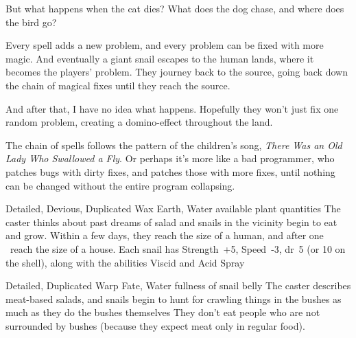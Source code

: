 But what happens when the cat dies?
What does the dog chase, and where does the bird go?

Every spell adds a new problem, and every problem can be fixed with more magic.
And eventually a giant snail escapes to the human lands, where it becomes the players' problem.
They journey back to the source, going back down the chain of magical fixes until they reach the source.

And after that, I have no idea what happens.
Hopefully they won't just fix one random problem, creating a domino-effect throughout the land.

The chain of spells follows the pattern of the children's song, \textit{There Was an Old Lady Who Swallowed a Fly}.
Or perhaps it's more like a bad programmer, who patches bugs with dirty fixes, and patches those with more fixes, until nothing can be changed without the entire program collapsing.


  {Detailed, Devious, Duplicated}%
  {Wax}%
  {Earth, Water}%
  {available plant quantities}%
  {The caster thinks about past dreams of salad and  snails in the vicinity begin to eat and grow.
  Within a few days, they reach the size of a human, and after one \showOnset\ reach the size of a house.
  Each snail has Strength~+5, Speed~-3, \gls{dr}~5 (or 10 on the shell), along with the abilities Viscid and Acid Spray}%
  {}

  {Detailed, Duplicated}%
  {Warp}%
  {Fate, Water}%
  {fullness of snail belly}%
  {The caster describes meat-based salads, and  snails begin to hunt for crawling things in the bushes as much as they do the bushes themselves}%
  {They don't eat people who are not surrounded by bushes (because they expect meat only in regular food).}



